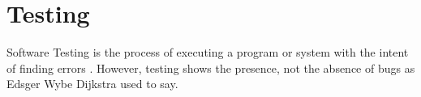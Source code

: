 \section{Testing}
\label{sec:related:testing}

Software Testing is the process of executing a program or system
with the intent of finding errors \cite{Myers:1979:AST:539883}.
However, testing shows the presence, not the absence of bugs as
Edsger Wybe Dijkstra used to say.
